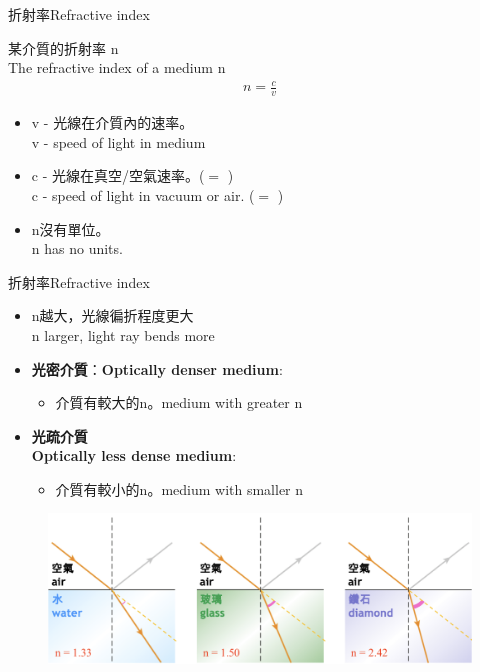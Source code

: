 \documentclass[beamer=true]{standalone}
\begin{document}
\begin{frame}{折射率Refractive index}
    \begin{exampleblock}
        {某介質的折射率 n \\The refractive index of a medium n}
        \begin{align*}
            n=\frac{c}{v}
        \end{align*}
    \end{exampleblock}
    \begin{itemize}
        \item v - 光線在介質內的速率。\\v - speed of light in medium
        \item c - 光線在真空/空氣速率。($=$ )\\c -  speed of light in vacuum or air. ($=$ )
        \item n沒有單位。 \\n has no units.
    \end{itemize}
\end{frame}


\begin{frame}{折射率Refractive index}
    \begin{itemize}
   
        \item n越大，光線徧折程度更大\\n larger, light ray bends more
        \item \textbf{光密介質}：\textbf{Optically denser medium}:
        \begin{itemize}
            \item 介質有較大的n。medium with greater n
        \end{itemize}
        \item \textbf{光疏介質}\\\textbf{Optically less dense medium}:
        \begin{itemize}
            \item 介質有較小的n。medium with smaller n
        \end{itemize}
    \end{itemize}
\begin{figure}
    \centering
    \includegraphics[width=0.75\linewidth]{assets/qdwqdij1342432.png}
\end{figure}
\end{frame}
\end{document}
